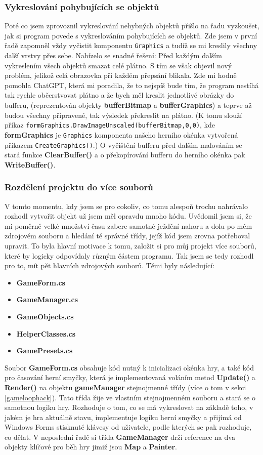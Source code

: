 \documentclass[a4]{article}
\begin{document}
\subsubsection{Vykreslování pohybujících se objektů} \label{buffering}
Poté co jsem zprovoznil vykreslování nehybných objektů přišlo na řadu vyzkoušet, jak si program povede s vykreslováním pohybujících se objektů. Zde jsem v první řadě zapomněl vždy vyčistit komponentu \verb|Graphics| a tudíž se mi kreslily všechny další vrstvy přes sebe. Nabízelo se snadné řešení: Před každým dalším vykreslením všech objektů smazat celé plátno. S tím se však objevil nový problém, jelikož celá obrazovka při každém přepsání blikala. Zde mi hodně pomohla ChatGPT, která mi poradila, že to nejspíš bude tím, že program nestíhá tak rychle občerstvovat plátno a že bych měl kreslit jednotlivé obrázky do bufferu, (reprezentován objekty \textbf{bufferBitmap} a \textbf{bufferGraphics}) a teprve až budou všechny připravené, tak výsledek překreslit na plátno. (K tomu slouží příkaz \verb|formGraphics.DrawImageUnscaled(bufferBitmap,0,0)|, kde \textbf{formGraphics} je \verb|Graphics| komponenta našeho herního okénka vytvořená příkazem \verb|CreateGraphics()|.) O vyčištění bufferu před dalším malováním se stará funkce \textbf{ClearBuffer()} a o překopírování bufferu do herního okénka pak \textbf{WriteBuffer()}.

\subsubsection{Rozdělení projektu do více souborů}
V tomto momentu, kdy jsem se pro cokoliv, co tomu alespoň trochu nahrávalo rozhodl vytvořit objekt už jsem měl opravdu mnoho kódu. Uvědomil jsem si, že mi poměrně velké množství času zabere samotné ježdění nahoru a dolu po mém zdrojovém souboru a hledání té správné třídy, jejíž kód jsem zrovna potřeboval upravit. To byla hlavní motivace k tomu, založit si pro můj projekt více souborů, které by logicky odpovídaly různým částem programu. Tak jsem se tedy rozhodl pro to, mít pět hlavních zdrojových souborů. Těmi byly následující:
\begin{itemize}
    \item \textbf{GameForm.cs}
    \item \textbf{GameManager.cs}
    \item \textbf{GameObjects.cs}
    \item \textbf{HelperClasses.cs}
    \item \textbf{GamePresets.cs}
\end{itemize}
Soubor \textbf{GameForm.cs} obsahuje kód nutný k inicializaci okénka hry, a také kód pro časování herní smyčky, která je implementovaná voláním metod \textbf{Update()} a \textbf{Render()} na objektu \textbf{gameManager} stejnojmenné třídy (více o tom v sekci \ref{gameloophack}). Tato třída žije ve vlastním stejnojmenném souboru a stará se o samotnou logiku hry. Rozhoduje o tom, co se má vykreslovat na základě toho, v jakém je hra aktuálně stavu, implementuje logiku herní smyčky a přijímá od Windows Forms stisknuté klávesy od uživatele, podle kterých se pak rozhoduje, co dělat. V neposlední řadě si třída \textbf{GameManager} drží reference na dva objekty klíčové pro běh hry jimiž jsou \textbf{Map} a \textbf{Painter}.
\end{document}
